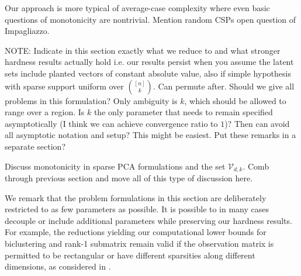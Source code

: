 \documentclass[11pt]{article}
\begin{document}
Our approach is more typical of average-case complexity where even basic questions of monotonicity are nontrivial. Mention random CSPs open question of Impagliazzo.

NOTE: Indicate in this section exactly what we reduce to and what stronger hardness results actually hold i.e. our results persist when you assume the latent sets include planted vectors of constant absolute value, also if simple hypothesis with sparse support uniform over $\binom{[n]}{k}$. Can permute after. Should we give all problems in this formulation? Only ambiguity is $k$, which should be allowed to range over a region. Is $k$ the only parameter that needs to remain specified asymptotically (I think we can achieve convergence ratio to $1$)? Then can avoid all asymptotic notation and setup? This might be easiest. Put these remarks in a separate section?

Discuss monotonicity in sparse PCA formulations and the set $\mathcal{V}_{d, k}$. Comb through previous section and move all of this type of discussion here.

We remark that the problem formulations in this section are deliberately restricted to as few parameters as possible. It is possible to in many cases decouple or include additional parameters while preserving our hardness results. For example, the reductions yielding our computational lower bounds for biclustering and rank-1 submatrix remain valid if the observation matrix is permitted to be rectangular or have different sparsities along different dimensions, as considered in \cite{cai2015computational}.
\end{document}
